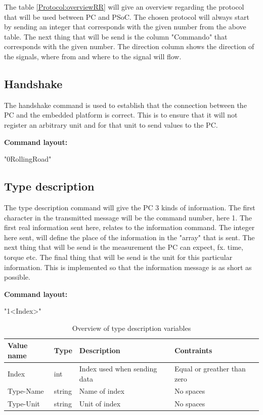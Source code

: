 The table \ref{Protocol:overviewRR} will give an overview regarding the protocol that will be used between PC and PSoC. The chosen protocol will always start by sending an integer that corresponds with the given number from the above table.  The next thing that will be send is the column "Commando" that corresponds with the given number. The direction column shows the direction of the signals, where from and where to the signal will flow.

\subsection{Handshake}
The handshake command is used to establish that the connection between the PC and the embedded platform is correct. This is to ensure that it will not register an arbitrary unit and for that unit to send values to the PC.  

\textbf{Command layout:}

"0\textvisiblespace RollingRoad"

\subsection{Type description}
The type description command will give the PC 3 kinds of information. The first character in the transmitted message will be the command number, here 1. The first real information sent here, relates to the information command. The integer here sent, will define the place of the information in the "array" that is sent. The next thing that will be send is the measurement the PC can expect, fx. time, torque etc. The final thing that will be send is the unit for this particular information. This is implemented so that the information message is as short as possible.

\textbf{Command layout:}

"1\textvisiblespace <Index>"

\begin{table}[h!]
	\centering
	\label{Protocol:SP4RR_TypeDescVars}
	\begin{tabular}{llll}
		Value name 	& Type 		& Description 					& Contraints  					\\\hline
		Index  		& int   	& Index used when sending data 	& Equal or greather than zero	\\
		Type-Name  	& string 	& Name of index 				& No spaces						\\
		Type-Unit  	& string	& Unit of index					& No spaces 					\\
	\end{tabular}
	\caption{Overview of type description variables}
\end{table}

